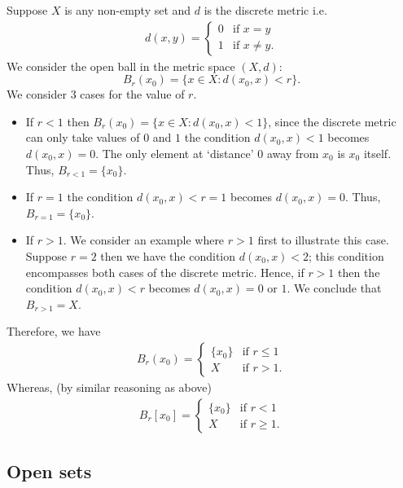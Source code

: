 \documentclass[12pt, a4paper]{article}
\begin{document}
\begin{mdexample}
    Suppose \(X\) is any non-empty set and \(d\) is the discrete metric i.e.
    \[\begin{aligned}
        d(x,y) = \begin{cases}
            0 &\text{if } x = y \\
            1 &\text{if } x \neq y.
        \end{cases}
    \end{aligned}\]
    We consider the open ball in the metric space \((X,d)\):
    \[B_r(x_0) = \{x \in X : d(x_0,x) <r\}.\]
    We consider \(3\) cases for the value of \(r\).
    \begin{itemize}
        \item If \(r<1\) then \(B_r(x_0) = \{x \in X : d(x_0,x)<1\}\), since the discrete metric can only take values of \(0\) and \(1\) the condition \(d(x_0,x)<1\) becomes \(d(x_0,x)=0\). The only element at `distance' \(0\) away from \(x_0\) is \(x_0\) itself. Thus, \(B_{r<1} = \{x_0\}\).
        \item If \(r=1\) the condition \(d(x_0,x)<r=1\) becomes \(d(x_0,x)=0\). Thus, \(B_{r=1} = \{x_0\}\).
        \item If \(r>1\). We consider an example where \(r>1\) first to illustrate this case. Suppose \(r=2\) then we have the condition \(d(x_0,x)<2\); this condition encompasses both cases of the discrete metric. Hence, if \(r>1\) then the condition \(d(x_0,x)<r\) becomes \(d(x_0,x) = 0\) or \(1\). We conclude that \(B_{r>1} = X\).
    \end{itemize}
    Therefore, we have 
    \[\begin{aligned}
        B_r(x_0) = \begin{cases}
            \{x_0\} &\text{if } r\leq 1 \\
            X &\text{if } r>1.
        \end{cases}
    \end{aligned}\]
    Whereas, (by similar reasoning as above)
    \[\begin{aligned}
        B_r[x_0] = \begin{cases}
            \{x_0\} &\text{if } r< 1 \\
            X &\text{if } r \geq 1.
        \end{cases}
    \end{aligned}\]
\end{mdexample}

\subsection{Open sets}
\end{document}
